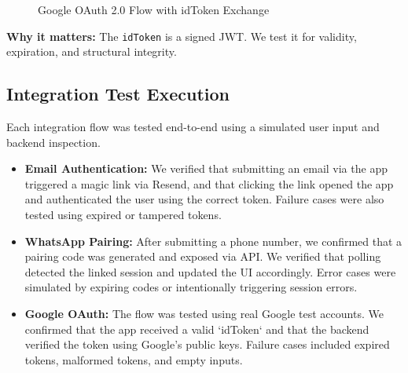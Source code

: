 \begin{figure}[h!]
    \centering
    \caption{Google OAuth 2.0 Flow with idToken Exchange}
    \label{fig:oauth-flow}
\end{figure}
    

\textbf{Why it matters:} The \texttt{idToken} is a signed JWT. We test it for validity, expiration, and structural integrity.

\subsection{Integration Test Execution}

Each integration flow was tested end-to-end using a simulated user input and backend inspection.

\begin{itemize}
    \item \textbf{Email Authentication:} We verified that submitting an email via the app triggered a magic link via Resend, and that clicking the link opened the app and authenticated the user using the correct token. Failure cases were also tested using expired or tampered tokens.
    \item \textbf{WhatsApp Pairing:} After submitting a phone number, we confirmed that a pairing code was generated and exposed via API. We verified that polling detected the linked session and updated the UI accordingly. Error cases were simulated by expiring codes or intentionally triggering session errors.
    \item \textbf{Google OAuth:} The flow was tested using real Google test accounts. We confirmed that the app received a valid `idToken` and that the backend verified the token using Google's public keys. Failure cases included expired tokens, malformed tokens, and empty inputs.
\end{itemize}

